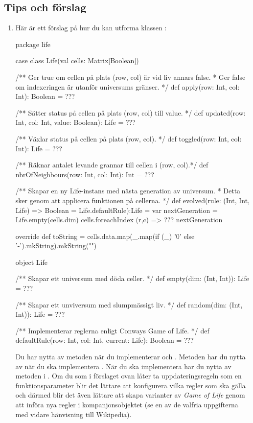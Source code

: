 \subsection{Tips och förslag}

\begin{enumerate}[leftmargin=*]
\item Här är ett förslag på hur du kan utforma klassen :
\begin{CodeSmall}
package life

case class Life(val cells: Matrix[Boolean]) {

  /** Ger true om cellen på plats (row, col) är vid liv annars false.
    * Ger false om indexeringen är utanför universums gränser.
    */
  def apply(row: Int, col: Int): Boolean = ???

  /** Sätter status på cellen på plats (row, col) till value. */
  def updated(row: Int, col: Int, value: Boolean): Life = ???

  /** Växlar status på cellen på plats (row, col). */
  def toggled(row: Int, col: Int): Life = ???

  /** Räknar antalet levande grannar till cellen i (row, col).*/
  def nbrOfNeighbours(row: Int, col: Int): Int = ???

  /** Skapar en ny Life-instans med nästa generation av universum.
    * Detta sker genom att applicera funktionen  på cellerna.
    */
  def evolved(rule: (Int, Int, Life) => Boolean = Life.defaultRule):Life = {
    var nextGeneration = Life.empty(cells.dim)
    cells.foreachIndex { (r,c) =>
      ???
    }
    nextGeneration
  }

  override def toString =
    cells.data.map(_.map(if (_) '0' else '-').mkString).mkString("\n")
}

object Life {
  /** Skapar ett universum med döda celler. */
  def empty(dim: (Int, Int)): Life = ???

  /** Skapar ett unviversum med slumpmässigt liv. */
  def random(dim: (Int, Int)): Life = ???

  /** Implementerar reglerna enligt Conways Game of Life. */
  def defaultRule(row: Int, col: Int, current: Life): Boolean = ???
}
\end{CodeSmall}
Du har nytta av metoden  när du implementerar  och . Metoden  har du nytta av när du ska implementera . När du ska implementera  har du nytta av metoden  i .
Om du som i förslaget ovan låter  ta uppdateringsregeln som en funktionsparameter blir det lättare att konfigurera vilka regler som ska gälla och därmed blir det även lättare att skapa varianter av \emph{Game of Life} genom att införa nya regler i kompanjonsobjektet (se en av de valfria uppgifterna med vidare hänvisning till Wikipedia).


\end{enumerate}
